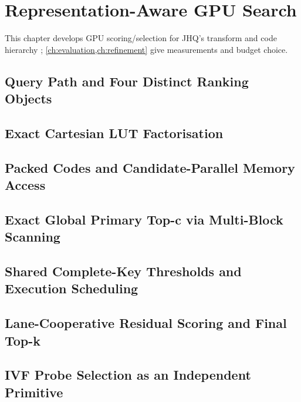 \chapter{Representation-Aware GPU Search}
\label{ch:gpu-execution}
This chapter develops GPU scoring/selection for JHQ's transform and code hierarchy \cite{jhq}; \cref{ch:evaluation,ch:refinement} give measurements and budget choice.

\section{Query Path and Four Distinct Ranking Objects}
\label{sec:5-1}


\section{Exact Cartesian LUT Factorisation}
\label{sec:5-2}


\section{Packed Codes and Candidate-Parallel Memory Access}
\label{sec:5-3}


\section{Exact Global Primary Top-c via Multi-Block Scanning}
\label{sec:5-4}


\section{Shared Complete-Key Thresholds and Execution Scheduling}
\label{sec:5-5}


\section{Lane-Cooperative Residual Scoring and Final Top-k}
\label{sec:5-6}


\section{IVF Probe Selection as an Independent Primitive}
\label{sec:5-7}

